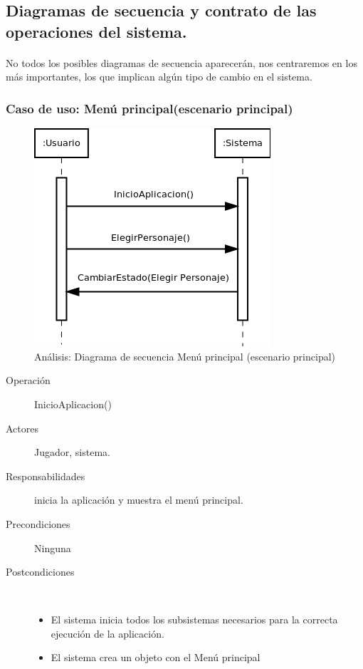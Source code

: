 \subsection{Diagramas de secuencia y contrato de las operaciones del sistema.}

\paragraph{}
No todos los posibles diagramas de secuencia aparecerán, nos centraremos en los más importantes, los que implican algún tipo de 
cambio en el sistema.

\subsubsection{Caso de uso: Menú principal(escenario principal)}

\begin{figure}[H]
  \label{secuencia_menu_principal1}
  \begin{center}
    \includegraphics[scale=0.7]{imagenes/analisis/secuencia_menu_principal1.png}
  \end{center}
  \caption{Análisis: Diagrama de secuencia Menú principal (escenario principal)}
\end{figure}

\begin{description}
    \item [Operación] InicioAplicacion()
    \item [Actores] Jugador, sistema.
    \item [Responsabilidades] inicia la aplicación y muestra el menú principal.
    \item [Precondiciones] Ninguna
    \item [Postcondiciones] $\quad$
        \begin{itemize}
            \item El sistema inicia todos los subsistemas necesarios para la correcta ejecución de la aplicación.
            \item El sistema crea un objeto con el Menú principal
        \end{itemize}
\end{description}

